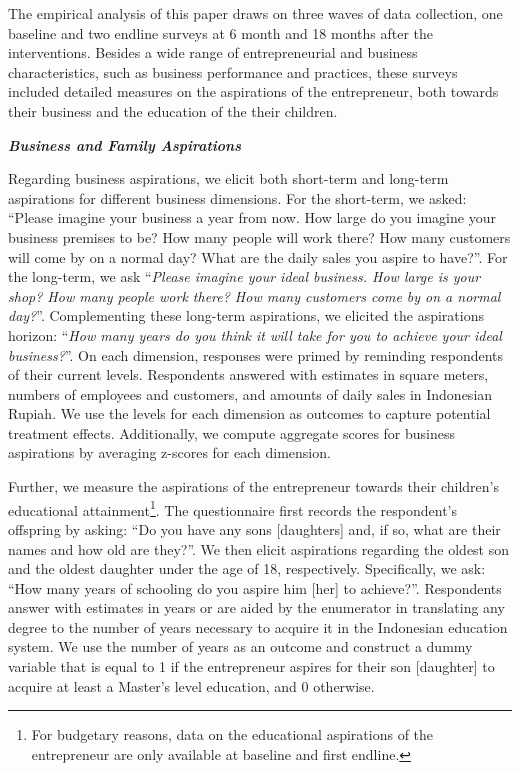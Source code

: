 \documentclass[11.5pt]{article}
\begin{document}
The empirical analysis of this paper draws on three waves of data collection, one baseline and two endline surveys at 6 month and 18 months after the interventions. Besides a wide range of entrepreneurial and business characteristics, such as business performance and practices, these surveys included detailed measures on the aspirations of the entrepreneur, both towards their business and the education of the their children.

\textbf{\emph{Business and Family Aspirations}}

Regarding business aspirations, we elicit both short-term and long-term aspirations for different business dimensions. For the short-term, we asked: ``Please imagine your business a year from now. How large do you imagine your business premises to be? How many people will work there? How many customers will come by on a normal day? What are the daily sales you aspire to have?''. For the long-term, we ask ``\emph{Please imagine your ideal business. How large is your shop? How many people work there? How many customers come by on a normal day?}''. Complementing these long-term aspirations, we elicited the aspirations horizon: ``\emph{How many years do you think it will take for you to achieve your ideal business?}''. On each dimension, responses were primed by reminding respondents of their current levels. Respondents answered with estimates in square meters, numbers of employees and customers, and amounts of daily sales in Indonesian Rupiah. We use the levels for each dimension as outcomes to capture potential treatment effects. Additionally, we compute aggregate scores for business aspirations by averaging z-scores for each dimension.

Further, we measure the aspirations of the entrepreneur towards their children's educational attainment\footnote{For budgetary reasons, data on the educational aspirations of the entrepreneur are only available at baseline and first endline.}. The questionnaire first records the respondent's offspring by asking: ``Do you have any sons [daughters] and, if so, what are their names and how old are they?''. We then elicit aspirations regarding the oldest son and the oldest daughter under the age of 18, respectively. Specifically, we ask: ``How many years of schooling do you aspire him [her] to achieve?''. Respondents answer with estimates in years or are aided by the enumerator in translating any degree to the number of years necessary to acquire it in the Indonesian education system. We use the number of years as an outcome and construct a dummy variable that is equal to 1 if the entrepreneur aspires for their son [daughter] to acquire at least a Master's level education, and 0 otherwise. \\
\end{document}

